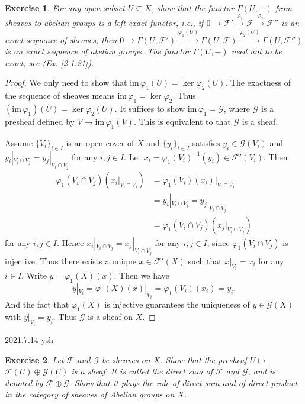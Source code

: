\documentclass{amsart}
\newtheorem{exe}{Exercise}[subsection]
\theoremstyle{remark}\newtheorem{rmk}[theorem]{Remark}
\begin{document}
\begin{exe}
	\label{2.1.8}
	For any open subset $U\subseteq X$, show that the functor $\Gamma(U,-)$ from sheaves to abelian groups is a left exact functor, i.e., if $0{\longrightarrow}\mathscr{F}'\xrightarrow{\varphi_1}\mathscr{F}\xrightarrow{\varphi_2}\mathscr{F}''$ is an exact sequence of sheaves, then $0{\longrightarrow}\Gamma(U,\mathscr{F}')\xrightarrow{\varphi_1(U)}{}\Gamma(U,\mathscr{F})\xrightarrow{\varphi_2(U)}{}\Gamma(U,\mathscr{F}'')$ is an exact sequence of abelian groups. The functor $\Gamma(U,-)$ need not to be exact; see \textup{(Ex. \ref{2.1.21})}.
\end{exe}

\begin{proof}
	We only need to show that $\mathrm{im}\,\varphi_1(U)=\ker\varphi_2(U)$. The exactness of the sequence of sheaves means $\mathrm{im}\,\varphi_1=\ker\varphi_2$. Thus $(\mathrm{im}\,\varphi_1)(U)=\ker\varphi_2(U)$. It suffices to show $\mathrm{im}\,\varphi_1=\mathscr{G}$, where $\mathscr{G}$ is a presheaf defined by $V\to\mathrm{im}\,\varphi_1(V)$. This is equivalent to that $\mathscr{G}$ is a sheaf.
	
	Assume $\{V_i\}_{i\in I}$ is an open cover of $X$ and $\{y_i\}_{i\in I}$ satisfies $y_i\in\mathscr{G}(V_i)$ and $y_i|_{V_i\cap V_j}=y_j|_{V_i\cap V_j}$ for any $i,j\in I$. Let $x_i=\varphi_1(V_i)^{-1}(y_i)\in\mathscr{F}'(V_i)$. Then 
	\begin{align*}
	\varphi_1(V_i\cap V_j)(x_i|_{V_i\cap V_j})&=\varphi_1(V_i)(x_i)|_{V_i\cap V_j}\\
	&=y_i|_{V_i\cap V_j}=y_j|_{V_i\cap V_j}\\
	&=\varphi_1(V_i\cap V_j)(x_j|_{V_i\cap V_j})
	\end{align*}
	for any $i,j\in I$. Hence $x_i|_{V_i\cap V_j}=x_j|_{V_i\cap V_j}$ for any $i,j\in I$, since $\varphi_1(V_i\cap V_j)$ is injective. Thus there exists a unique $x\in\mathscr{F}'(X)$ such that $x|_{V_i}=x_i$ for any $i\in I$. Write $y=\varphi_1(X)(x)$. Then we have $$y|_{V_i}=\varphi_1(X)(x)|_{V_i}=\varphi_1(V_i)(x_i)=y_i.$$ And the fact that $\varphi_1(X)$ is injective guarantees the uniqueness of $y\in\mathscr{G}(X)$ with $y|_{V_i}=y_i$. Thus $\mathscr{G}$ is a sheaf on $X$.
\end{proof}

2021.7.14 ysh
\begin{exe}
               Let $\mathscr{F}$ and $\mathscr{G}$ be sheaves on $X$. Show that the presheaf $U \mapsto$ $\mathscr{F}(U) \oplus \mathscr{G}(U)$ is a sheaf. It is called the direct sum of $\mathscr{F}$ and $\mathscr{G}$, and is denoted by $\mathscr{F} \oplus \mathscr{G} .$ Show that it plays the role of direct sum and of direct product in the category of sheaves of Abelian groups on $X$.
\end{exe}
\end{document}
